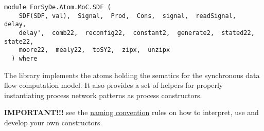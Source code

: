 \label{module:ForSyDe.Atom.MoC.SDF}
\haddockbeginheader
{\haddockverb\begin{verbatim}
module ForSyDe.Atom.MoC.SDF (
    SDF(SDF, val),  Signal,  Prod,  Cons,  signal,  readSignal,  delay, 
    delay',  comb22,  reconfig22,  constant2,  generate2,  stated22,  state22, 
    moore22,  mealy22,  toSY2,  zipx,  unzipx
  ) where\end{verbatim}}
\haddockendheader

The  library implements the atoms holding the sematics for the
 synchronous data flow computation model. It also provides a set of
 helpers for properly instantiating process network patterns as
 process constructors.\par
\textbf{IMPORTANT!!!}
 see the \href{ForSyDe-Atom.html#naming_conv}{naming convention} rules
 on how to interpret, use and develop your own constructors.\par

